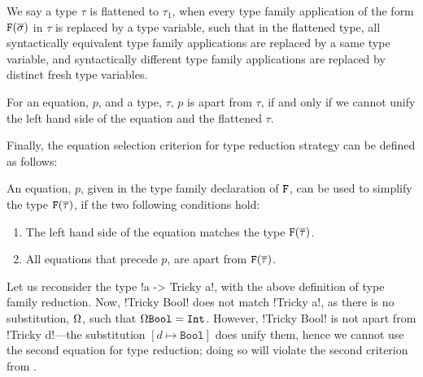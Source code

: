 \documentclass[format=acmsmall,manuscript,screen,nonacm,margin=1in,11pt]{acmart}
\begin{document}
\begin{defn}\label{def:ctf-flatten}
  We say a type $\tau$ is flattened to $\tau_1$, when every
  type family application of the form $\texttt{F}(\overline{\sigma})$ in $\tau$
  is replaced by a type variable, such that in the flattened type,
  all syntactically equivalent type family applications
  are replaced by a same type variable, and syntactically different
  type family applications are replaced by distinct fresh type variables.
\end{defn}
\begin{defn}\label{def:ctf-apart}
  For an equation, $p$, and a type, $\tau$, $p$ is apart from $\tau$, if
  and only if we cannot unify the left hand side of the equation and the flattened $\tau$.
\end{defn}
Finally, the equation selection criterion for type reduction strategy can be defined as follows:
\begin{defn}\label{def:ctf-simpl-1}
  An equation, $p$, given in the type family declaration of $\texttt{F}$, can be used to simplify the type
  $\texttt{F}(\overline{\tau})$, if the two following conditions hold:
  \begin{enumerate}
  \item The left hand side of the equation matches the type $\texttt{F}(\overline{\tau})$.
  \item All equations that precede $p$, are apart from $\texttt{F}(\overline{\tau})$.
  \end{enumerate}
\end{defn}
Let us reconsider the type !a -> Tricky a!, with the above definition of type family reduction.
Now, !Tricky Bool! does not match !Tricky a!, as there is no substitution,
$\Omega$, such that $\Omega\texttt{Bool} = \texttt{Int}$.
However, !Tricky Bool! is not apart from !Tricky d!---the substitution $[d\mapsto\texttt{Bool}]$ does unify them,
hence we cannot use the second equation for type reduction; doing so will violate
the second criterion from .

\end{document}
